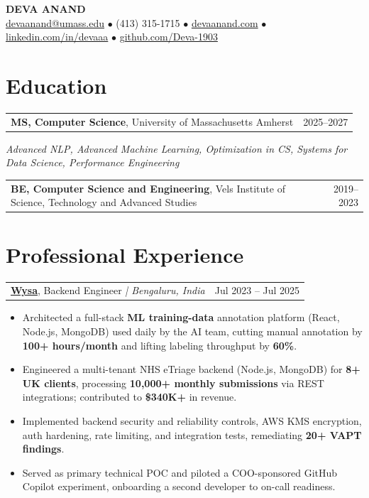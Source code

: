 \documentclass[letterpaper,11pt]{article}
\makeatletter
\newcommand{\eduItem}[3]{%
  \begin{tabular*}{\textwidth}{@{}l@{\extracolsep{\fill}}r@{}}
    \textbf{#1}, #2 & #3 \\
  \end{tabular*}\par
}
\newcommand{\expItem}[4]{%
  \vspace{3pt}
  \begin{tabular*}{\textwidth}{@{}l@{\extracolsep{\fill}}r@{}}
    \textbf{#1}, #2 \textit{| #3} & #4 \\
  \end{tabular*}\par\vspace{-2pt}
}
\makeatother
\begin{document}
\begin{center}
    {\fontsize{18}{20}\selectfont\bfseries DEVA ANAND}\\ \vspace{3pt}
    {\small
    \href{mailto:devaanand@umass.edu}{devaanand@umass.edu}
    \enspace$\bullet$\enspace
    (413) 315-1715
    \enspace$\bullet$\enspace
    \href{https://devaanand.com}{devaanand.com}
    \enspace$\bullet$\enspace
    \href{https://linkedin.com/in/devaaa/}{linkedin.com/in/devaaa}
    \enspace$\bullet$\enspace
    \href{https://github.com/Deva-1903}{github.com/Deva-1903}}
\end{center}
\vspace{-6pt}

\section{Education}
\eduItem{MS, Computer Science}{University of Massachusetts Amherst}{2025--2027}
{\small\textit{Advanced NLP, Advanced Machine Learning, Optimization in CS, Systems for Data Science, Performance Engineering}}\par
\vspace{3pt}
\eduItem{BE, Computer Science and Engineering}{Vels Institute of Science, Technology and Advanced Studies}{2019--2023}

\section{Professional Experience}

\expItem{\href{https://www.wysa.io}{Wysa}}{Backend Engineer}{Bengaluru, India}{Jul 2023 -- Jul 2025}
\begin{itemize}
  \item Architected a full-stack \textbf{ML training-data} annotation platform (React, Node.js, MongoDB) used daily by the AI team, cutting manual annotation by \textbf{100+ hours/month} and lifting labeling throughput by \textbf{60\%}.
  \item Engineered a multi-tenant NHS eTriage backend (Node.js, MongoDB) for \textbf{8+ UK clients}, processing \textbf{10{,}000+ monthly submissions} via REST integrations; contributed to \textbf{\$340K+} in revenue.
  \item Implemented backend security and reliability controls, AWS KMS encryption, auth hardening, rate limiting, and integration tests, remediating \textbf{20+ VAPT findings}.
  \item Served as primary technical POC and piloted a COO-sponsored GitHub Copilot experiment, onboarding a second developer to on-call readiness.
\end{itemize}
\end{document}
